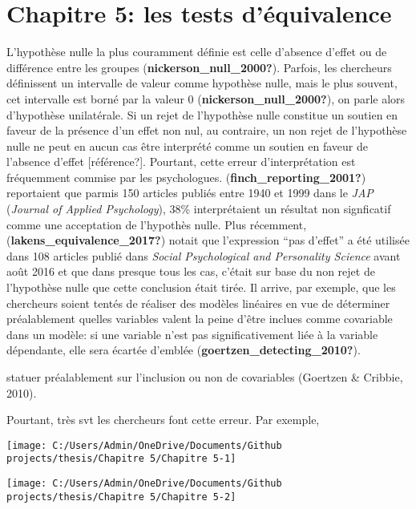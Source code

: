 \documentclass[
  english,
  man]{apa6}
\author{\phantom{0}}
\date{}
\affiliation{\phantom{0}}
\begin{document}
\hypertarget{chapitre-5-les-tests-duxe9quivalence}{%
\section{Chapitre 5: les tests d'équivalence}\label{chapitre-5-les-tests-duxe9quivalence}}

L'hypothèse nulle la plus couramment définie est celle d'absence d'effet ou de différence entre les groupes (\textbf{nickerson\_null\_2000?}). Parfois, les chercheurs définissent un intervalle de valeur comme hypothèse nulle, mais le plus souvent, cet intervalle est borné par la valeur 0 (\textbf{nickerson\_null\_2000?}), on parle alors d'hypothèse unilatérale. Si un rejet de l'hypothèse nulle constitue un soutien en faveur de la présence d'un effet non nul, au contraire, un non rejet de l'hypothèse nulle ne peut en aucun cas être interprété comme un soutien en faveur de l'absence d'effet {[}référence?{]}. Pourtant, cette erreur d'interprétation est fréquemment commise par les psychologues. (\textbf{finch\_reporting\_2001?}) reportaient que parmis 150 articles publiés entre 1940 et 1999 dans le \emph{JAP} (\emph{Journal of Applied Psychology}), 38\% interprétaient un résultat non signficatif comme une acceptation de l'hypothès nulle. Plus récemment, (\textbf{lakens\_equivalence\_2017?}) notait que l'expression ``pas d'effet'' a été utilisée dans 108 articles publié dans \emph{Social Psychological and Personality Science} avant août 2016 et que dans presque tous les cas, c'était sur base du non rejet de l'hypothèse nulle que cette conclusion était tirée. Il arrive, par exemple, que les chercheurs soient tentés de réaliser des modèles linéaires en vue de déterminer préalablement quelles variables valent la peine d'être inclues comme covariable dans un modèle: si une variable n'est pas significativement liée à la variable dépendante, elle sera écartée d'emblée (\textbf{goertzen\_detecting\_2010?}).

statuer préalablement sur l'inclusion ou non de covariables (Goertzen \& Cribbie, 2010).

Pourtant, très svt les chercheurs font cette erreur. Par exemple,

\begin{center}\texttt{[image: C:/Users/Admin/OneDrive/Documents/Github projects/thesis/Chapitre 5/Chapitre 5-1]} \end{center}

\begin{center}\texttt{[image: C:/Users/Admin/OneDrive/Documents/Github projects/thesis/Chapitre 5/Chapitre 5-2]} \end{center}
\end{document}
